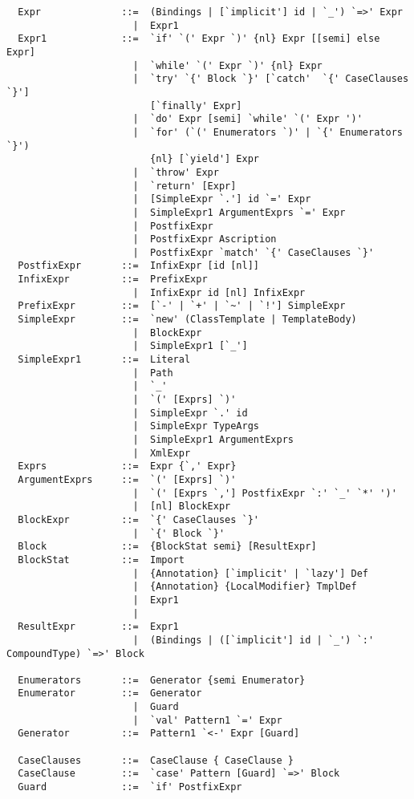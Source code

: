 {\begin{lstlisting}
  Expr              ::=  (Bindings | [`implicit'] id | `_') `=>' Expr
                      |  Expr1
  Expr1             ::=  `if' `(' Expr `)' {nl} Expr [[semi] else Expr]
                      |  `while' `(' Expr `)' {nl} Expr
                      |  `try' `{' Block `}' [`catch'  `{' CaseClauses `}'] 
                         [`finally' Expr]
                      |  `do' Expr [semi] `while' `(' Expr ')'
                      |  `for' (`(' Enumerators `)' | `{' Enumerators `}') 
                         {nl} [`yield'] Expr
                      |  `throw' Expr
                      |  `return' [Expr]
                      |  [SimpleExpr `.'] id `=' Expr
                      |  SimpleExpr1 ArgumentExprs `=' Expr
                      |  PostfixExpr
                      |  PostfixExpr Ascription
                      |  PostfixExpr `match' `{' CaseClauses `}'
  PostfixExpr       ::=  InfixExpr [id [nl]]
  InfixExpr         ::=  PrefixExpr
                      |  InfixExpr id [nl] InfixExpr
  PrefixExpr        ::=  [`-' | `+' | `~' | `!'] SimpleExpr 
  SimpleExpr        ::=  `new' (ClassTemplate | TemplateBody)
                      |  BlockExpr
                      |  SimpleExpr1 [`_']
  SimpleExpr1       ::=  Literal
                      |  Path
                      |  `_'
                      |  `(' [Exprs] `)'
                      |  SimpleExpr `.' id 
                      |  SimpleExpr TypeArgs
                      |  SimpleExpr1 ArgumentExprs
                      |  XmlExpr
  Exprs             ::=  Expr {`,' Expr}
  ArgumentExprs     ::=  `(' [Exprs] `)'
                      |  `(' [Exprs `,'] PostfixExpr `:' `_' `*' ')'
                      |  [nl] BlockExpr
  BlockExpr         ::=  `{' CaseClauses `}'
                      |  `{' Block `}'
  Block             ::=  {BlockStat semi} [ResultExpr]
  BlockStat         ::=  Import
                      |  {Annotation} [`implicit' | `lazy'] Def
                      |  {Annotation} {LocalModifier} TmplDef
                      |  Expr1
                      |
  ResultExpr        ::=  Expr1
                      |  (Bindings | ([`implicit'] id | `_') `:' CompoundType) `=>' Block

  Enumerators       ::=  Generator {semi Enumerator}
  Enumerator        ::=  Generator
                      |  Guard
                      |  `val' Pattern1 `=' Expr
  Generator         ::=  Pattern1 `<-' Expr [Guard]

  CaseClauses       ::=  CaseClause { CaseClause }
  CaseClause        ::=  `case' Pattern [Guard] `=>' Block 
  Guard             ::=  `if' PostfixExpr


\end{lstlisting}}
